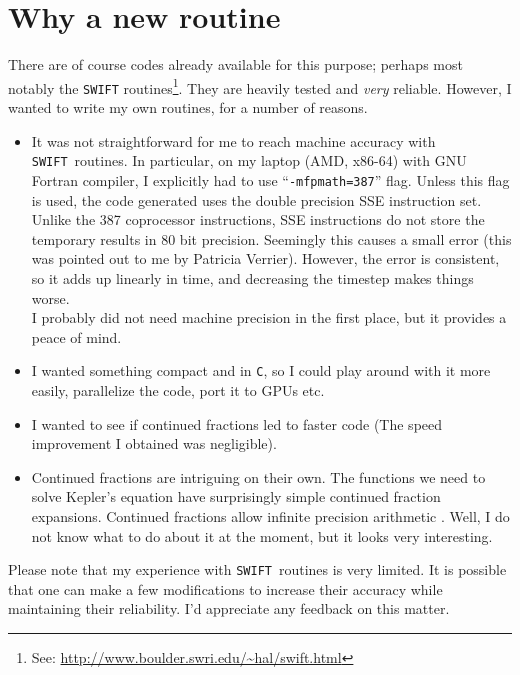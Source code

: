 \documentclass{article}
\newcommand{\swift}{{\tt SWIFT}}
\begin{document}
\section{Why a new routine}
There are of course codes already available for this purpose;
perhaps most notably the \texttt{SWIFT} 
routines\footnote{See: \url{http://www.boulder.swri.edu/~hal/swift.html}}.
They are heavily tested and {\em very} reliable. However, I wanted to
write my own routines, for a number of reasons.
\begin{itemize}
\item It was not straightforward for me to reach machine accuracy
with \swift\ routines. In particular, on my laptop (AMD, x86-64) with
GNU Fortran compiler, I explicitly had to use ``\verb|-mfpmath=387|''
flag. Unless this flag is used, the code generated uses the double
precision SSE instruction set. Unlike the 387 coprocessor instructions,
SSE instructions do not store the temporary results in 80 bit precision.
Seemingly this causes a small error (this was pointed out to me by
Patricia Verrier). However, the error is consistent, so it adds up linearly
in time, and decreasing the timestep makes things worse.\\
I probably did not need machine precision in the first place,
but it provides a peace of mind.
\item I wanted something compact and in \texttt{C}, so I could play
around with it more easily, parallelize the code, port it to GPUs etc.
\item I wanted to see if continued fractions led to faster code (The speed
improvement I obtained was negligible).
\item Continued fractions are intriguing on their own. The functions
we need to solve Kepler's equation have surprisingly simple continued
fraction expansions. Continued fractions allow infinite precision
arithmetic \citep{1972HAKMEM..239..101}. Well, I do not know what to do
about it at the moment, but it looks very interesting.
\end{itemize}
Please note that my experience with \swift\ routines is very limited.
It is possible that one can make a few modifications to increase
their accuracy while maintaining their reliability. I'd appreciate any
feedback on this matter. 
\end{document}
